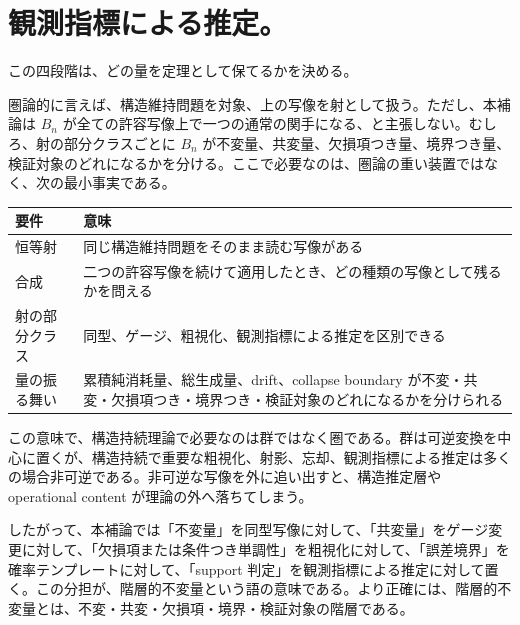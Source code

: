 \documentclass[12pt,a4paper]{article}
\begin{document}
\section{観測指標による推定。}\label{ux89b3ux6e2cux6307ux6a19ux306bux3088ux308bux63a8ux5b9a}

この四段階は、どの量を定理として保てるかを決める。

圏論的に言えば、構造維持問題を対象、上の写像を射として扱う。ただし、本補論は \(B_{n}\) が全ての許容写像上で一つの通常の関手になる、と主張しない。むしろ、射の部分クラスごとに \(B_{n}\) が不変量、共変量、欠損項つき量、境界つき量、検証対象のどれになるかを分ける。ここで必要なのは、圏論の重い装置ではなく、次の最小事実である。

{\def\LTcaptype{table} %
\begin{longtable}[]{@{}
  >{\raggedright\arraybackslash}p{}
  >{\raggedright\arraybackslash}p{}@{}}
\toprule\noalign{}
\begin{minipage}[b]{\linewidth}\raggedright
要件
\end{minipage} & \begin{minipage}[b]{\linewidth}\raggedright
意味
\end{minipage} \\
\midrule\noalign{}
\endhead
\bottomrule\noalign{}
\endlastfoot
恒等射 & 同じ構造維持問題をそのまま読む写像がある \\
合成 & 二つの許容写像を続けて適用したとき、どの種類の写像として残るかを問える \\
射の部分クラス & 同型、ゲージ、粗視化、観測指標による推定を区別できる \\
量の振る舞い & 累積純消耗量、総生成量、drift、collapse boundary が不変・共変・欠損項つき・境界つき・検証対象のどれになるかを分けられる \\
\end{longtable}
}

この意味で、構造持続理論で必要なのは群ではなく圏である。群は可逆変換を中心に置くが、構造持続で重要な粗視化、射影、忘却、観測指標による推定は多くの場合非可逆である。非可逆な写像を外に追い出すと、構造推定層や operational content が理論の外へ落ちてしまう。

したがって、本補論では「不変量」を同型写像に対して、「共変量」をゲージ変更に対して、「欠損項または条件つき単調性」を粗視化に対して、「誤差境界」を確率テンプレートに対して、「support 判定」を観測指標による推定に対して置く。この分担が、階層的不変量という語の意味である。より正確には、階層的不変量とは、不変・共変・欠損項・境界・検証対象の階層である。
\end{document}
